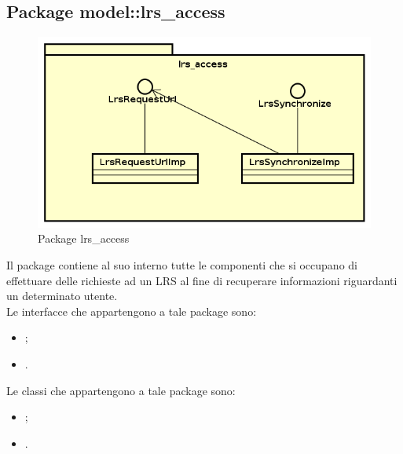 \documentclass[../Tesi.tex]{subfiles}
\begin{document}
	\subsection{Package model::lrs\_access}
		\begin{figure}[H]
			\centering
			\includegraphics[scale=0.6]{images/package_diagrams/lrs_access}
				\caption{Package lrs\_access}
		\end{figure}
		Il package  contiene al suo interno tutte le componenti che si occupano di effettuare delle richieste ad un LRS al fine di recuperare informazioni riguardanti un determinato utente. \\
		Le interfacce che appartengono a tale package sono:
		\begin{itemize}
			\item {};
			\item {}.
		\end{itemize}
		Le classi che appartengono a tale package sono:
		\begin{itemize}
			\item {};
			\item {}.
		\end{itemize}
\end{document}
